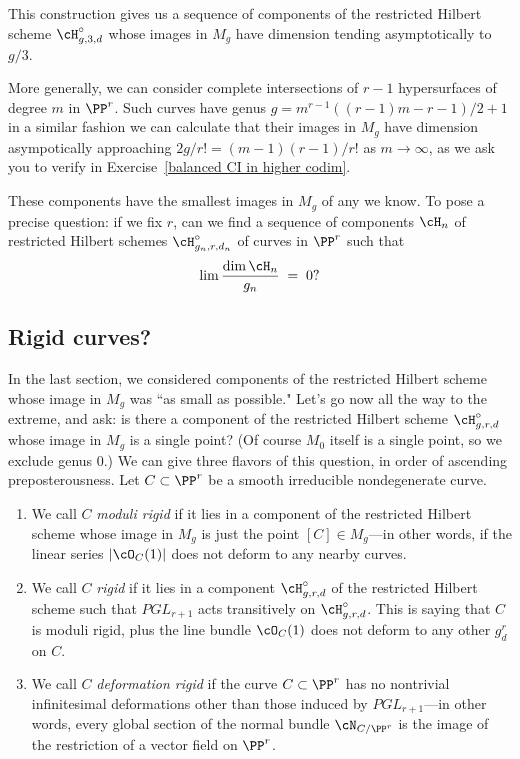 This construction gives us a sequence of components of the restricted Hilbert scheme $\cH^\circ_{g,3,d}$ whose images in $M_g$ have dimension tending asymptotically to $g/3$.

More generally, we can consider complete intersections of $r-1$ hypersurfaces of degree $m$ in $\PP^r$. Such curves have
genus $g = m^{r-1}((r-1)m-r-1)/2 +1$ in a similar fashion we can calculate that their images in $M_g$ have dimension asympotically approaching $2g/r!= (m-1)(r-1)/r!$
 as $m \to \infty$, as we ask you to verify in Exercise~\ref{balanced CI in higher codim}.


These components have the smallest images in $M_{g}$ of any we know. To pose a precise question: if we fix $r$, can we find a sequence of components $\cH_n$ of  restricted Hilbert schemes  $\cH^\circ_{g_n,r,d_n}$ of curves in $\PP^r$ such that
$$
\lim \frac{\dim \cH_n}{g_n} \; = \; 0?
$$

\subsection{Rigid curves?}\label{rigid?}

In the last section, we considered components of the restricted Hilbert scheme whose image in $M_g$ was ``as small as possible." Let's go now all the way to the extreme, and ask: is there a component of the restricted Hilbert scheme $\cH^\circ_{g,r,d}$ whose image in $M_g$ is a single point? (Of course $M_0$ itself is a single point, so we exclude genus 0.) We can give three flavors of this question, in order of ascending preposterousness. Let $C \subset \PP^r$ be
a smooth irreducible nondegenerate curve.

\begin{enumerate} 
\item We call $C$ \emph{moduli rigid} if it lies in a component of the restricted Hilbert scheme whose image in $M_g$ is just the point $[C] \in M_g$---in other words, if the linear series $|\cO_C(1)|$ does not deform to any nearby curves.


\item We call $C$ \emph{rigid} if it lies in a component $\cH^\circ_{g,r,d}$ of the restricted Hilbert scheme such that $PGL_{r+1}$ acts transitively on $\cH^\circ_{g,r,d}$. This is saying that $C$ is moduli rigid, plus the line bundle $\cO_C(1)$ does not deform to any other $g^r_d$ on $C$.

\item We call $C$ \emph{deformation rigid} if the curve $C \subset \PP^r$ has no nontrivial infinitesimal deformations other than those induced by $PGL_{r+1}$---in other words, every global section of the normal bundle $\cN_{C/\PP^r}$ is the image of the restriction of a vector field on $\PP^r$.
\end{enumerate}

